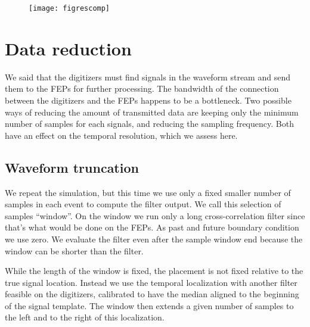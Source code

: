 
\begin{figure}
    \hspace{0.00\textwidth}
    \texttt{[image: figrescomp]}
    

\end{figure}

\section{Data reduction}

We said that the digitizers must find signals in the waveform stream and send
them to the FEPs for further processing. The bandwidth of the connection
between the digitizers and the FEPs happens to be a bottleneck. Two possible
ways of reducing the amount of transmitted data are keeping only the minimum
number of samples for each signals, and reducing the sampling frequency. Both
have an effect on the temporal resolution, which we assess here.

\subsection{Waveform truncation}

We repeat the simulation, but this time we use only a fixed smaller number of
samples in each event to compute the filter output. We call this selection of
samples ``window''. On the window we run only a long cross-correlation filter
since that's what would be done on the FEPs. As past and future boundary
condition we use zero. We evaluate the filter even after the sample window end
because the window can be shorter than the filter.

While the length of the window is fixed, the placement is not fixed relative to
the true signal location. Instead we use the temporal localization with another
filter feasible on the digitizers, calibrated to have the median aligned to the
beginning of the signal template. The window then extends a given number of
samples to the left and to the right of this localization.

